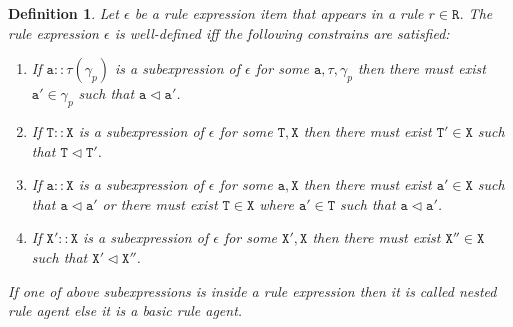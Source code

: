 \documentclass[12pt]{article}
\newtheorem{mydef}{Definition}
\begin{document}
\begin{mydef}
Let $\epsilon$ be a rule expression item that appears in a rule $r\in\mathtt{R}$. The \emph{rule expression} $\epsilon$ is \emph{well-defined} iff the following constrains are satisfied:

\begin{enumerate}
 \item If $\mathtt{a}::\tau(\gamma_p)$ is a subexpression of $\epsilon$ for some $\mathtt{a},\tau,\gamma_p$ then there must exist $\mathtt{a}' \in \gamma_p$ such that $\mathtt{a} \lhd \mathtt{a}'$.

\item If $\mathtt{T}::\mathtt{X}$ is a subexpression of $\epsilon$ for some $\mathtt{T},\mathtt{X}$ then there must exist $\mathtt{T}' \in \mathtt{X}$ such that $\mathtt{T} \lhd \mathtt{T}'$.

\item If $\mathtt{a}::\mathtt{X}$ is a subexpression of $\epsilon$ for some $\mathtt{a},\mathtt{X}$ then there must exist $\mathtt{a}' \in \mathtt{X}$ such that $\mathtt{a} \lhd \mathtt{a}'$ or there must exist $\mathtt{T} \in \mathtt{X}$ where $ \mathtt{a}' \in \mathtt{T}$ such that $\mathtt{a} \lhd \mathtt{a}'$.

\item If $\mathtt{X}'::\mathtt{X}$ is a subexpression of $\epsilon$ for some $\mathtt{X}',\mathtt{X}$ then there must exist $\mathtt{X}'' \in \mathtt{X}$ such that $\mathtt{X}' \lhd \mathtt{X}''$.

\end{enumerate}
 
If one of above subexpressions is inside a rule expression then it is called \emph{nested} rule agent else it is a \emph{basic} rule agent.
\end{mydef}
\end{document}
